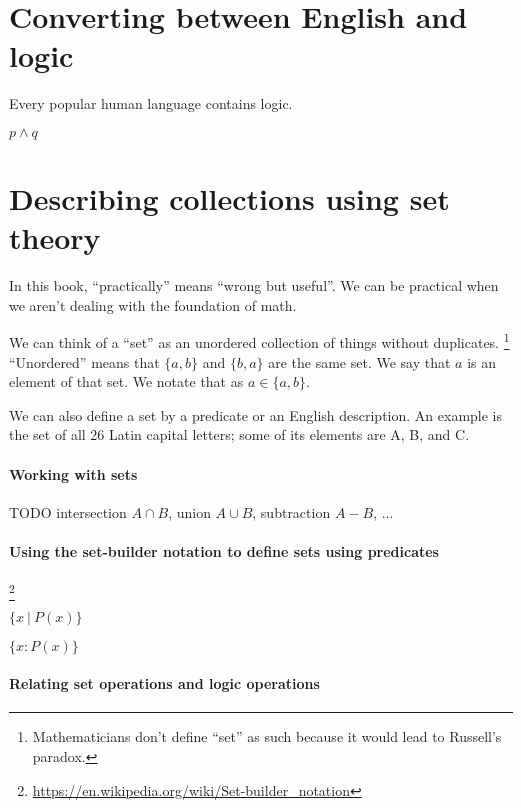 \section{Converting between English and logic}

Every popular human language contains logic.

\( p \wedge q \)

\section{Describing collections using set theory}

%
In this book, \enquote{practically} means \enquote{wrong but useful}.
We can be practical when we aren't dealing with the foundation of math.

%
We can think of a \enquote{set} as an unordered collection of things without duplicates.%
\footnote{Mathematicians don't define \enquote{set} as such because it would lead to Russell's paradox.}
\enquote{Unordered} means that \( \{a,b\} \) and \( \{b,a\} \) are the same set.
We say that \( a \) is an element of that set.
We notate that as \( a \in \{a,b\} \).

We can also define a set by a predicate or an English description.
An example is the set of all 26 Latin capital letters;
some of its elements are A, B, and C.

\paragraph{Working with sets}

TODO intersection \(A \cap B\),
union \(A \cup B\),
subtraction \(A - B\), ...

\paragraph{Using the set-builder notation to define sets using predicates}

\footnote{\url{https://en.wikipedia.org/wiki/Set-builder_notation}}

\( \{ x ~|~ P(x) \} \)

\( \{ x : P(x) \} \)

\paragraph{Relating set operations and logic operations}

